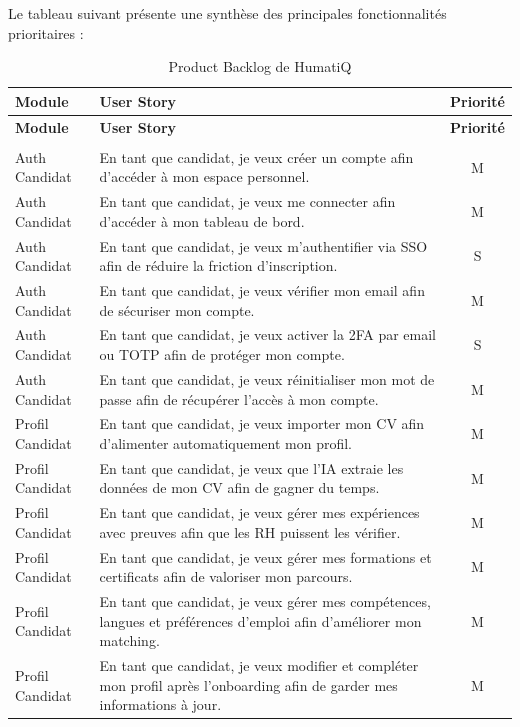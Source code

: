 Le tableau suivant présente une synthèse des principales fonctionnalités prioritaires :
~\\
\begin{longtable}{|p{3.5cm}|p{10cm}|c|}
\caption{Product Backlog de HumatiQ} \label{tab:product_backlog} \\
\hline
\rowcolor[HTML]{EFEFEF} \textbf{Module} & \textbf{User Story} & \textbf{Priorité} \\ \hline
\endfirsthead
\hline
\rowcolor[HTML]{EFEFEF} \textbf{Module} & \textbf{User Story} & \textbf{Priorité} \\ \hline
\endhead
\hline
\endfoot
\hline
\endlastfoot
\multicolumn{3}{|l|}{\textbf{Authentification et Profil Candidat}} \\ \hline
Auth Candidat & En tant que candidat, je veux créer un compte afin d'accéder à mon espace personnel. & M \\ \hline
Auth Candidat & En tant que candidat, je veux me connecter afin d'accéder à mon tableau de bord. & M \\ \hline
Auth Candidat & En tant que candidat, je veux m'authentifier via SSO afin de réduire la friction d'inscription. & S \\ \hline
Auth Candidat & En tant que candidat, je veux vérifier mon email afin de sécuriser mon compte. & M \\ \hline
Auth Candidat & En tant que candidat, je veux activer la 2FA par email ou TOTP afin de protéger mon compte. & S \\ \hline
Auth Candidat & En tant que candidat, je veux réinitialiser mon mot de passe afin de récupérer l'accès à mon compte. & M \\ \hline
Profil Candidat & En tant que candidat, je veux importer mon CV afin d'alimenter automatiquement mon profil. & M \\ \hline
Profil Candidat & En tant que candidat, je veux que l'IA extraie les données de mon CV afin de gagner du temps. & M \\ \hline
Profil Candidat & En tant que candidat, je veux gérer mes expériences avec preuves afin que les RH puissent les vérifier. & M \\ \hline
Profil Candidat & En tant que candidat, je veux gérer mes formations et certificats afin de valoriser mon parcours. & M \\ \hline
Profil Candidat & En tant que candidat, je veux gérer mes compétences, langues et préférences d'emploi afin d'améliorer mon matching. & M \\ \hline
Profil Candidat & En tant que candidat, je veux modifier et compléter mon profil après l'onboarding afin de garder mes informations à jour. & M \\ \hline

\end{longtable}
